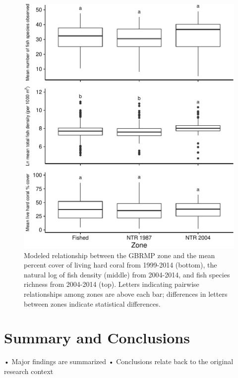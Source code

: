\documentclass[12pt,]{article}
\begin{document}
\begin{figure}

{\centering \includegraphics{Mullaney_ENV872_Project_files/figure-latex/Zoning Plots-1} 

}

\caption{Modeled relationship between the GBRMP zone and the mean percent cover of living hard coral from 1999-2014 (bottom), the natural log of fish density (middle) from 2004-2014, and fish species richness from 2004-2014 (top). Letters indicating pairwise relationships among zones are above each bar; differences in letters between zones indicate statistical differences.}\label{fig:Zoning Plots}
\end{figure}
\newpage

\hypertarget{summary-and-conclusions}{%
\section{Summary and Conclusions}\label{summary-and-conclusions}}

• Major findings are summarized • Conclusions relate back to the
original research context
\end{document}
